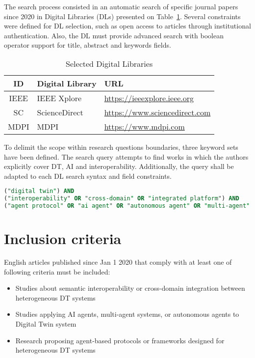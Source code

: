 The search process consisted in an automatic search of specific journal papers since 2020 in 
    Digital Libraries (DLs) presented on Table~\ref{tab:digital-library}.
Several constraints were defined for DL selection, such as
    open access to articles through institutional authentication.
Also, the DL must provide advanced search with boolean operator support for 
    title, abstract and keywords fields. 

\begin{table}[H]
    \centering
    \caption{Selected Digital Libraries}
    \label{tab:digital-library}
    \begin{tabular}{c | l | l}
        \textbf{ID} & \textbf{Digital Library} & \textbf{URL} \\
        \hline
        IEEE & IEEE Xplore   & \url{https://ieeexplore.ieee.org} \\
        SC   & ScienceDirect & \url{https://www.sciencedirect.com} \\
        MDPI & MDPI          & \url{https://www.mdpi.com} \\
    \end{tabular}
\end{table}

To delimit the scope within research questions boundaries, three keyword sets have been defined.
The search query attempts to find works in which the authors explicitly cover DT, AI and interoperability.
Additionally, the query shall be adapted to each DL search syntax and field constraints.

\begin{lstlisting}[language=SQL, label=lst:search-query, caption=Search Query Structure, basicstyle=\ttfamily\small, breaklines, breakatwhitespace]
("digital twin") AND 
("interoperability" OR "cross-domain" OR "integrated platform") AND 
("agent protocol" OR "ai agent" OR "autonomous agent" OR "multi-agent" OR "agent-mediated" OR "agent communication" OR "large language model" OR "llm" OR "generative ai")
\end{lstlisting}

\section{Inclusion criteria}

English articles published since Jan 1 2020 that comply with
    at least one of following criteria must be included:

\begin{itemize}
    \item Studies about semantic interoperability or cross-domain integration between heterogeneous DT systems
    \item Studies applying AI agents, multi-agent systems, or autonomous agents to Digital Twin system
    \item Research proposing agent-based protocols or frameworks designed for heterogeneous DT systems
\end{itemize}

